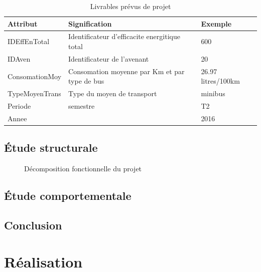 \documentclass[a4paper]{report}
\begin{document}
\begin{doublespace}
	\begin{table}[H]
		\begin{center}
			\begin{tabularx}{17.5cm}{|X|X|X|}
				\hline
				\textbf{Attribut} & \textbf{Signification}                        &
				\textbf{Exemple}                                                            \\
				\hline
				IDEffEnTotal      & Identificateur d'efficacite energitique total &
				600                                                                         \\
				\hline
				IDAven            & Identificateur de l'avenant                   & 20      \\
				\hline
				ConsomationMoy    & Consomation moyenne par Km et par type de bus &
				26.97 litres/100km                                                          \\
				\hline
				TypeMoyenTrans    & Type du moyen de transport                    & minibus \\
				\hline
				Periode           & semestre                                      & T2      \\
				\hline
				Annee             &                                               & 2016    \\
				\hline
			\end{tabularx}
			\caption{Livrables prévus de projet}
		\end{center}
	\end{table}
	\section{Étude structurale}
    \begin{figure}[H]
		\begin{center}
			\caption{Décomposition fonctionnelle du projet}
		\end{center}
	\end{figure}
	\section{Étude comportementale}
	\section{Conclusion}
	\chapter{Réalisation}
	\renewcommand{\headrulewidth}{1pt}
	\fancyhead[L]{\hspace*{5cm}}
\end{doublespace}
\appendix
\end{document}
